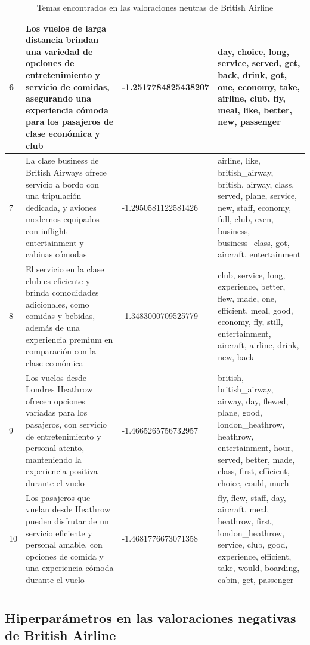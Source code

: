 \documentclass{report}
\begin{document}
\begin{longtable}{|p{1cm}|p{4cm}|p{4cm}|p{6cm}|}
                    \hline
                    6 & Los vuelos de larga distancia brindan una variedad de opciones de entretenimiento y servicio de comidas, asegurando una experiencia cómoda para los pasajeros de clase económica y club & -1.2517784825438207 & day, choice, long, service, served, get, back, drink, got, one, economy, take, airline, club, fly, meal, like, better, new, passenger \\
                    \hline
                    7 & La clase business de British Airways ofrece servicio a bordo con una tripulación dedicada, y aviones modernos equipados con inflight entertainment y cabinas cómodas & -1.2950581122581426 & airline, like, british\_airway, british, airway, class, served, plane, service, new, staff, economy, full, club, even, business, business\_class, got, aircraft, entertainment \\
                    \hline
                    8 & El servicio en la clase club es eficiente y brinda comodidades adicionales, como comidas y bebidas, además de una experiencia premium en comparación con la clase económica & -1.3483000709525779 & club, service, long, experience, better, flew, made, one, efficient, meal, good, economy, fly, still, entertainment, aircraft, airline, drink, new, back \\
                    \hline
                    9 & Los vuelos desde Londres Heathrow ofrecen opciones variadas para los pasajeros, con servicio de entretenimiento y personal atento, manteniendo la experiencia positiva durante el vuelo & -1.4665265756732957 & british, british\_airway, airway, day, flewed, plane, good, london\_heathrow, heathrow, entertainment, hour, served, better, made, class, first, efficient, choice, could, much \\
                    \hline
                    10 & Los pasajeros que vuelan desde Heathrow pueden disfrutar de un servicio eficiente y personal amable, con opciones de comida y una experiencia cómoda durante el vuelo & -1.4681776673071358 & fly, flew, staff, day, aircraft, meal, heathrow, first, london\_heathrow, service, club, good, experience, efficient, take, would, boarding, cabin, get, passenger \\
                    \hline
                    \caption{Temas encontrados en las valoraciones neutras de British Airline}
                \end{longtable}
            \clearpage\subsection{Hiperparámetros en las valoraciones negativas de British Airline}
\end{document}
